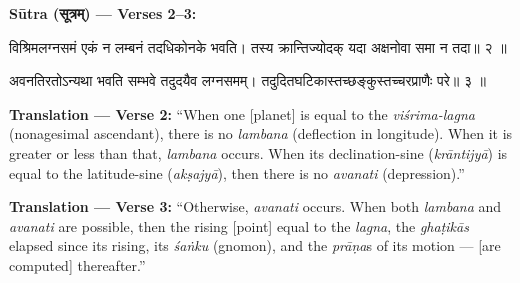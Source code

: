 \documentclass[11pt,a4paper]{article}
\newcommand{\dev}[1]{{\devanagarifont #1}}
\newenvironment{sanskritverse}{%
  \begin{center}\begin{minipage}{0.95\textwidth}
  \setlength{\leftskip}{1em}
  \setlength{\rightskip}{1em}
  \dev
}{\end{minipage}\end{center}}
\newenvironment{paracol}[1]{\begingroup}{\endgroup}
\newcommand{\switchcolumn}[1][]{%
  \ifnum#1=0\relax\else\par\nobreak\vspace{0.5em}\par\nobreak\fi%
}
\begin{document}
\vspace{0.5em}
\noindent\textbf{Sūtra (\dev{सूत्रम्}) — Verses 2--3:}

\begin{paracol}{2}

\begin{sanskritverse}
विश्रिमलग्नसमं एकं न लम्बनं तदधिकोनके भवति।
तस्य क्रान्तिज्योदक् यदा अक्षनोवा समा न तदा॥ २ ॥
\end{sanskritverse}

\begin{sanskritverse}
अवनतिरतोऽन्यथा भवति सम्भवे तदुदयैव लग्नसमम्।
तदुदितघटिकास्तच्छङ्कुस्तच्चरप्राणैः परे॥ ३ ॥
\end{sanskritverse}

\switchcolumn

\textbf{Translation — Verse 2:} ``When one [planet] is equal to the \textit{viśrima-lagna} (nonagesimal ascendant), there is no \textit{lambana} (deflection in longitude). When it is greater or less than that, \textit{lambana} occurs. When its declination-sine (\textit{krāntijyā}) is equal to the latitude-sine (\textit{akṣajyā}), then there is no \textit{avanati} (depression).''

\textbf{Translation — Verse 3:} ``Otherwise, \textit{avanati} occurs. When both \textit{lambana} and \textit{avanati} are possible, then the rising [point] equal to the \textit{lagna}, the \textit{ghaṭikās} elapsed since its rising, its \textit{śaṅku} (gnomon), and the \textit{prāṇa}s of its motion --- [are computed] thereafter.''

\end{paracol}

\vspace{0.5em}
\end{document}
